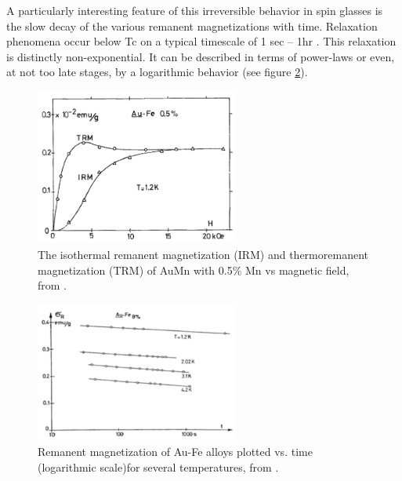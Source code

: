 A particularly interesting feature of this irreversible behavior in spin glasses 
is the slow decay of the various remanent magnetizations with time. 
Relaxation phenomena occur below Tc on a typical timescale of 1 sec -- 1hr
\cite{tholence:jpa-00215633,Holtzberg1977,NIEUWENHUYS1977880}. This relaxation is distinctly non-exponential. It can be 
described in terms of power-laws\cite{NIEUWENHUYS1977880} or even, at not too late stages, by a 
logarithmic behavior\cite{Holtzberg1977} (see figure \ref{fig:au-fe-remanent}).


\begin{figure}
  \centering
  \includegraphics[width=0.6\textwidth]{img/trm-irm.png}
  \caption{\label{fig:trm-irm}The isothermal remanent magnetization (IRM) and 
thermoremanent magnetization (TRM) of AuMn with 0.5\% Mn vs magnetic field, 
from \citet{tholence:jpa-00215633}.}
\end{figure}

\begin{figure}
  \centering
  \includegraphics[width=0.6\textwidth]{img/remenant.png}
  \caption{ \label{fig:au-fe-remanent}Remanent magnetization of Au-Fe alloys plotted vs. time (logarithmic scale)for several temperatures, from \citet{Holtzberg1977}.}
\end{figure}

